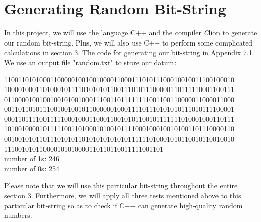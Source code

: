 \documentclass[a4paper,12pt]{article}
\begin{document}
\section{Generating Random Bit-String}
\noindent In this project, we will use the language C++ and the compiler {\emph Clion} to generate our random bit-string. Plus, we will also use C++ to perform some complicated calculations in section 3. The code for generating our bit-string in Appendix 7.1. \\
\noindent We use an output file "random.txt" to store our datum:\\
\begin{tcolorbox}[title = {random.txt}] %
11001101010001100000100100100001100011101011100010010011100100010\\10000100011010001011110101010110011101011100000110111110001100111\\01100001001001001010010001110011011111111001100110000011000011000\\00110110101110010010010110000001000111101110101010111010111100001\\00011011110011111000100011000110010101100101111111010001000110111\\10100100001011111001101000101001011110001000100101001101110000110\\00100101011011101010110101010101010111111010001010110010110010010\\111001010110000101010000110110110011111001101\\
number of 1s: 246\\
number of 0s: 254
\end{tcolorbox}

\noindent Please note that we will use this particular bit-string throughout the entire section 3. Furthermore, we will apply all three tests mentioned above to this particular bit-string so as to check if C++ can generate high-quality random numbers.
\end{document}

